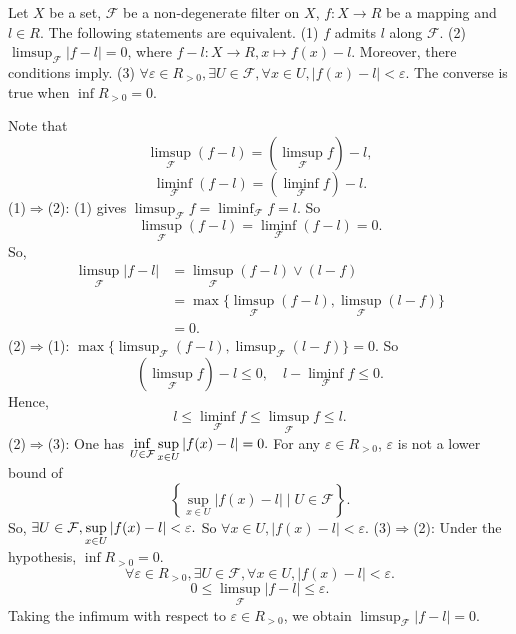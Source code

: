 \begin{theoremenv}
    Let $X$ be a set, $\mathcal{F}$ be a non-degenerate filter on $X$, $f:X\longrightarrow R$ be a mapping and $l\in R$. The following statements are equivalent.
    \newline
    (1) $f$ admits $l$ along $\mathcal{F}$.
    \newline
    (2) $\limsup_{\mathcal{F}}\left|f-l\right|=0$, where $f-l:X\longrightarrow R, x\longmapsto f(x)-l$. Moreover, there conditions imply.
    \newline
    (3) $\forall \varepsilon\in R_{>0}, \exists U\in \mathcal{F}, \forall x\in U, \left|f(x)-l\right|<\varepsilon.$
    The converse is true when $\inf R_{>0}=0$. 
\end{theoremenv}
\begin{proofenv}
    Note that 
    $$\limsup_{\mathcal{F}}\left(f-l\right)=\left(\limsup_{\mathcal{F}}f\right)-l,$$
    $$\liminf_{\mathcal{F}}\left(f-l\right)=\left(\liminf_{\mathcal{F}}f\right)-l.$$
    (1)$\Rightarrow$(2): (1) gives $\limsup_{\mathcal{F}} f=\liminf_{\mathcal{F}} f=l$. So 
    $$\limsup_{\mathcal{F}}\left(f-l\right)=\liminf_{\mathcal{F}}\left(f-l\right)=0.$$
    So, \begin{align*}
        \limsup_{\mathcal{F}}\left|f-l\right|&=\limsup_\mathcal{F}\left(f-l\right)\vee \left(l-f\right)\\
        &=\max\{\limsup_{\mathcal{F}}(f-l),\limsup_{\mathcal{F}}(l-f)\}\\
        &=0.
    \end{align*}
    (2)$\Rightarrow$(1): $\max\{\limsup_{\mathcal{F}}(f-l),\limsup_{\mathcal{F}}(l-f)\}=0.$ So 
    $$\left(\limsup_{\mathcal{F}}f\right)-l \le 0,\quad l-\liminf_{\mathcal{F}}f\le 0.$$
    Hence, $$l\le \liminf_{\mathcal{F}}f\le \limsup_{\mathcal{F}}f\le l.$$
    (2)$\Rightarrow$(3): One has $\displaystyle \inf_{U\in \mathcal{F}}\sup_{x\in U}\left|f(x)-l\right|=0.$ For any $\varepsilon\in R_{>0}$, $\varepsilon$ is not a lower bound of
    $$\left\{\sup_{x\in U}\left|f(x)-l\right|\mid U\in \mathcal{F}\right\}.$$
    So, $\displaystyle \exists U\in \mathcal{F}, \sup_{x\in U}\left|f(x)-l\right|<\varepsilon.$ So $\forall x\in U, \left|f(x)-l\right|<\varepsilon$.
    \newline
    (3)$\Rightarrow$(2): Under the hypothesis, $\inf R_{>0}=0$. 
    $$\forall \varepsilon \in R_{>0}, \exists U\in \mathcal{F}, \forall x\in U, \left|f(x)-l\right|<\varepsilon.$$ 
    $$0\le \limsup_{\mathcal{F}}\left|f-l\right|\le \varepsilon.$$
    Taking the infimum with respect to $\varepsilon\in R_{>0}$, we obtain $\limsup_{\mathcal{F}}\left|f-l\right|=0.$
\end{proofenv}

